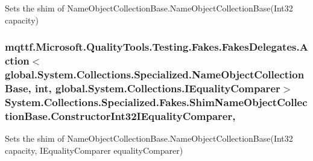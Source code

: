 Sets the shim of Name\-Object\-Collection\-Base.\-Name\-Object\-Collection\-Base(\-Int32 capacity)

\hypertarget{class_system_1_1_collections_1_1_specialized_1_1_fakes_1_1_shim_name_object_collection_base_ac4e3d2b56248eaec23c4f0824484f253}{
\subsubsection[{Constructor\-Int32\-I\-Equality\-Comparer}]{\setlength{\rightskip}{0pt plus 5cm}mqttf.\-Microsoft.\-Quality\-Tools.\-Testing.\-Fakes.\-Fakes\-Delegates.\-Action$<$global.\-System.\-Collections.\-Specialized.\-Name\-Object\-Collection\-Base, int, global.\-System.\-Collections.\-I\-Equality\-Comparer$>$ System.\-Collections.\-Specialized.\-Fakes.\-Shim\-Name\-Object\-Collection\-Base.\-Constructor\-Int32\-I\-Equality\-Comparer\hspace{0.3cm}{\ttfamily [static]}, {\ttfamily [set]}}}\label{class_system_1_1_collections_1_1_specialized_1_1_fakes_1_1_shim_name_object_collection_base_ac4e3d2b56248eaec23c4f0824484f253}


Sets the shim of Name\-Object\-Collection\-Base.\-Name\-Object\-Collection\-Base(\-Int32 capacity, I\-Equality\-Comparer equality\-Comparer)

